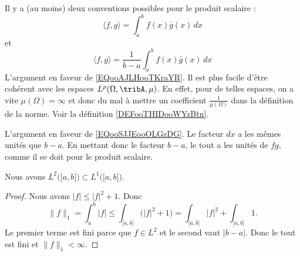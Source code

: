 \begin{normaltext}
	Il y a (au moins) deux conventions possibles pour le produit scalaire :
	\begin{equation}    \label{EQooAJLHooTKraYR}
		\langle f, g\rangle =\int_a^bf(x)\bar g(x)\,dx
	\end{equation}
	et
	\begin{equation}    \label{EQooSJJEooOLGzDG}
		\langle f, g\rangle =\frac{1}{ b-a }\int_a^bf(x)\bar g(x)\,dx
	\end{equation}
	L'argument en faveur de \eqref{EQooAJLHooTKraYR}. Il est plus facile d'être cohérent avec les espaces \( L^p(\Omega, \tribA, \mu)\). En effet, pour de telles espaces, on a vite \( \mu(\Omega)=\infty\) et donc du mal à mettre un coefficient \( \frac{1}{ \mu(\Omega) }\) dans la définition de la norme. Voir la définition \ref{DEFooTHIDooWYzBtn}.

	L'argument en faveur de \eqref{EQooSJJEooOLGzDG}. Le facteur \( dx\) a les mêmes unités que \( b-a\). En mettant donc le facteur \( b-a\), le tout a les unités de \( fg\), comme il se doit pour le produit scalaire.
\end{normaltext}

\begin{proposition}	\label{PROPooSPDIooKntTyz}
	Nous avons \( L^2\big( \mathopen[ a,b\mathclose] \big)\subset L^1\big( \mathopen[ a,b\mathclose] \big)\).
\end{proposition}

\begin{proof}
	Nous avons \( | f |\leq | f |^2+1\). Donc
	\begin{equation}
		\| f \|_1=\int_a^b| f |\leq \int_{\mathopen[ a,b\mathclose]}\big( | f |^2+1 \big)=\int_{\mathopen[ a,b\mathclose]}| f |^2+\int_{\mathopen[ a,b\mathclose]}1.
	\end{equation}
	Le premier terme est fini parce que \( f\in L^2\) et le second vaut \( | b-a |\). Donc le tout est fini et \( \| f \|_1<\infty\).
\end{proof}

